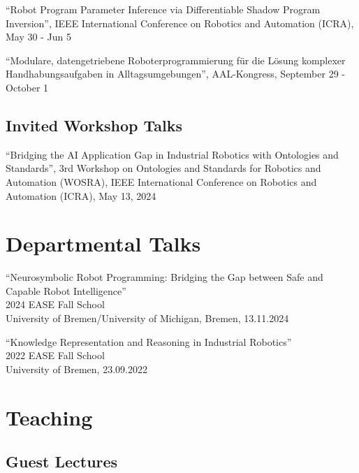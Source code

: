 \documentclass[11pt]{article} %
\begin{document}
\medskip

``Robot Program Parameter Inference via Differentiable Shadow Program Inversion'', IEEE International Conference on Robotics and Automation (ICRA), May 30 - Jun 5

\medskip


``Modulare, datengetriebene Roboterprogrammierung für die Lösung komplexer Handhabungsaufgaben in Alltagsumgebungen'', AAL-Kongress, September 29 - October 1

\subsection*{Invited Workshop Talks}

``Bridging the AI Application Gap in Industrial Robotics with Ontologies and Standards'', 3rd Workshop on Ontologies and Standards for Robotics and Automation (WOSRA), IEEE International Conference on Robotics and Automation (ICRA), May 13, 2024

\section*{Departmental Talks}

``Neurosymbolic Robot Programming: Bridging the Gap between Safe and Capable Robot Intelligence''\\
2024 EASE Fall School\\
University of Bremen/University of Michigan, Bremen, 13.11.2024

\medskip

``Knowledge Representation and Reasoning in Industrial Robotics''\\
2022 EASE Fall School\\
University of Bremen, 23.09.2022


\section*{Teaching}

\subsection*{Guest Lectures}
\end{document}
